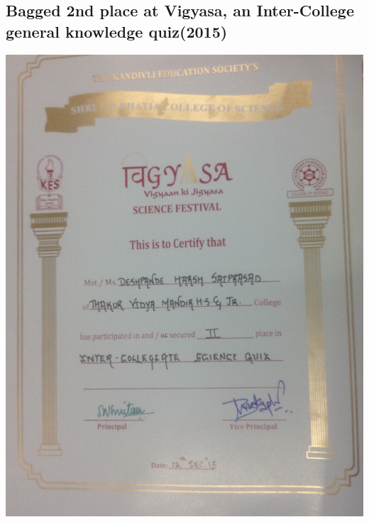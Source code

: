 \documentclass{article}
\begin{document}
	\subsection{Bagged 2nd place at Vigyasa, an Inter-College general knowledge quiz(2015)}
\begin{center}
	\includegraphics[width = 1.1\textwidth]{EX/vigyasa.jpeg}{\centering}
\end{center}
\end{document}
